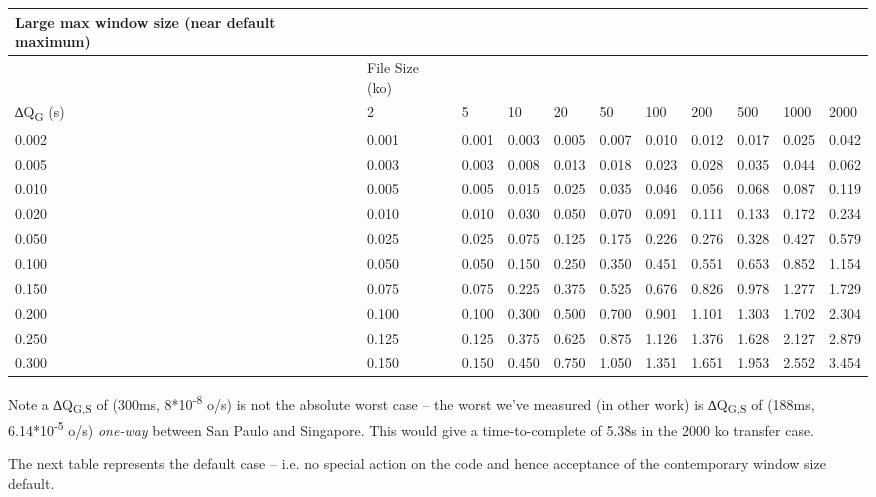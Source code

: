 \documentclass[11pt,a4paper]{article}
\begin{document}
\begin{longtable}[]{@{}lllllllllll@{}}
\toprule
Large max window size (near default maximum) & & & & & & & & &
&\tabularnewline
\midrule
\endhead
& File Size (ko) & & & & & & & & &\tabularnewline
∆Q\textbar{}\textsubscript{G} (s) & 2 & 5 & 10 & 20 & 50 & 100 & 200 &
500 & 1000 & 2000\tabularnewline
0.002 & 0.001 & 0.001 & 0.003 & 0.005 & 0.007 & 0.010 & 0.012 & 0.017 &
0.025 & 0.042\tabularnewline
0.005 & 0.003 & 0.003 & 0.008 & 0.013 & 0.018 & 0.023 & 0.028 & 0.035 &
0.044 & 0.062\tabularnewline
0.010 & 0.005 & 0.005 & 0.015 & 0.025 & 0.035 & 0.046 & 0.056 & 0.068 &
0.087 & 0.119\tabularnewline
0.020 & 0.010 & 0.010 & 0.030 & 0.050 & 0.070 & 0.091 & 0.111 & 0.133 &
0.172 & 0.234\tabularnewline
0.050 & 0.025 & 0.025 & 0.075 & 0.125 & 0.175 & 0.226 & 0.276 & 0.328 &
0.427 & 0.579\tabularnewline
0.100 & 0.050 & 0.050 & 0.150 & 0.250 & 0.350 & 0.451 & 0.551 & 0.653 &
0.852 & 1.154\tabularnewline
0.150 & 0.075 & 0.075 & 0.225 & 0.375 & 0.525 & 0.676 & 0.826 & 0.978 &
1.277 & 1.729\tabularnewline
0.200 & 0.100 & 0.100 & 0.300 & 0.500 & 0.700 & 0.901 & 1.101 & 1.303 &
1.702 & 2.304\tabularnewline
0.250 & 0.125 & 0.125 & 0.375 & 0.625 & 0.875 & 1.126 & 1.376 & 1.628 &
2.127 & 2.879\tabularnewline
0.300 & 0.150 & 0.150 & 0.450 & 0.750 & 1.050 & 1.351 & 1.651 & 1.953 &
2.552 & 3.454\tabularnewline
\bottomrule
\end{longtable}

Note a ∆Q\textbar{}\textsubscript{G,S} of (300ms,
8*10\textsuperscript{-8} o/s) is not the absolute worst case -- the
worst we've measured (in other work) is ∆Q\textbar{}\textsubscript{G,S}
of (188ms, 6.14*10\textsuperscript{-5} o/s) \emph{one-way} between San
Paulo and Singapore. This would give a time-to-complete of 5.38s in the
2000 ko transfer case.

The next table represents the default case -- i.e. no special action on
the code and hence acceptance of the contemporary window size default.
\end{document}
